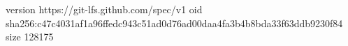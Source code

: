version https://git-lfs.github.com/spec/v1
oid sha256:c47c4031af1a96ffedc943c51ad0d76ad00daa4fa3b4b8bda33f63ddb9230f84
size 128175
